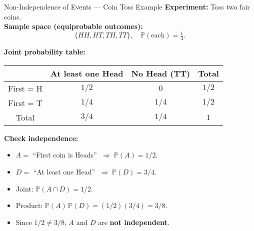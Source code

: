 \documentclass{beamer}
\newcommand{\1}{\mathbf{1}}
\begin{document}
\begin{frame}{Non-Independence of Events — Coin Toss Example}
  \small
  \textbf{Experiment:} Toss two fair coins. \\[0.5em]

  \textbf{Sample space (equiprobable outcomes):}
  \[
    \{ HH, HT, TH, TT \}, \quad \mathbb{P}(\text{each}) = \tfrac{1}{4}.
  \]

  \medskip
  \textbf{Joint probability table:}

  \begin{center}
    \begin{tabular}{c|c|c|c}
      & At least one Head & No Head (TT) & Total \\
      \hline
      First = H & $1/2$ & $0$   & $1/2$ \\
      \hline
      First = T & $1/4$ & $1/4$ & $1/2$ \\
      \hline
      Total & $3/4$ & $1/4$ & $1$
    \end{tabular}
  \end{center}

  \medskip
  \textbf{Check independence:}
  \begin{itemize}
    \item $A =$ “First coin is Heads” $\;\Rightarrow\; \mathbb{P}(A)=1/2$.
    \item $D =$ “At least one Head” $\;\Rightarrow\; \mathbb{P}(D)=3/4$.
    \item Joint: $\mathbb{P}(A \cap D) = 1/2$.
    \item Product: $\mathbb{P}(A)\,\mathbb{P}(D) = (1/2)(3/4) = 3/8$.
    \item Since $1/2 \neq 3/8$, $A$ and $D$ are \textbf{not independent}.
  \end{itemize}
\end{frame}
\end{document}
